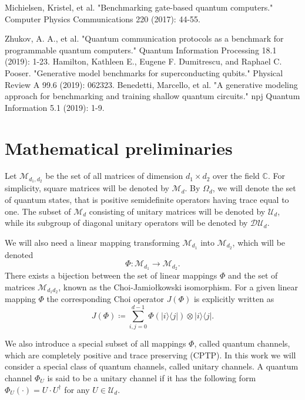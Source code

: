 \documentclass[preprint,12pt, a4paper, dvipsnames]{elsarticle}
\newcommand{\ket}[1]{\ensuremath{|#1\rangle}}
\newcommand{\bra}[1]{\ensuremath{\langle#1|}}
\newcommand{\ketbra}[2]{\ensuremath{\ket{#1}\bra{#2}}}
\newcommand{\1}{{\rm 1\hspace{-0.9mm}l}}
\newcommand{\DD}{\mathcal{D}}
\newcommand{\UU}{\mathcal{U}}
\theoremstyle{definition}
\begin{document}
\begin{thebibliography}{00}
 Michielsen, Kristel, et al. "Benchmarking
gate-based quantum computers." Computer Physics Communications 220 (2017):
44-55.

 Zhukov, A. A., et al. "Quantum communication
protocols as a benchmark for programmable quantum computers." Quantum
Information Processing 18.1 (2019): 1-23.
 Hamilton, Kathleen E., Eugene F. Dumitrescu,
and Raphael C. Pooser. "Generative model benchmarks for superconducting
qubits." Physical Review A 99.6 (2019): 062323.
 Benedetti, Marcello, et al. "A generative
modeling approach for benchmarking and training shallow quantum circuits." npj
Quantum Information 5.1 (2019): 1-9.


\end{thebibliography}


\appendix


\section{Mathematical preliminaries} \label{app:preliminaries}


Let $\mathcal{M}_{d_1,d_2}$ be the set of all matrices of dimension $d_1 \times d_2$ over
the field $\mathbb{C}$. For  simplicity, square matrices will be denoted by
$\mathcal{M}_d$.
By $\Omega_d$, we will denote the set of quantum states, that is
positive semidefinite operators having trace equal to one.
The subset of $\mathcal{M}_d$ consisting of unitary matrices will be denoted
by $\UU_d$, while its subgroup of diagonal unitary operators will be denoted by
$\DD \UU_d$.


We will also need a linear mapping transforming $\mathcal{M}_{d_1}$ into
$\mathcal{M}_{d_2}$, which will be denoted
\begin{equation}
\Phi: \mathcal{M}_{d_1 } \rightarrow \mathcal{M}_{d_2}.
\end{equation}
There
exists a bijection between the set of linear mappings $\Phi$ and the set of matrices $\mathcal{M}_{d_1d_2}$,  known as the Choi-Jamio{\l}kowski isomorphism.
For a given linear mapping $\Phi$ the corresponding Choi operator $J(\Phi)$ is explicitly written as
\begin{equation}
J(\Phi) \coloneqq \sum_{i,j=0}^{d- 1} \Phi(\ketbra{i}{j}) \otimes \ketbra{i}{j}. \end{equation}

We also introduce a special subset of all mappings $\Phi$, called quantum channels, which are completely positive
and trace preserving (CPTP).
In this work we will consider a special class of quantum channels, called unitary channels.  A
quantum channel
$\Phi_{U}$ is said to be a unitary channel if it has the following form $\Phi_U(\cdot) = U \cdot U^\dagger$ for any $U \in
\UU_d$.
\end{document}
